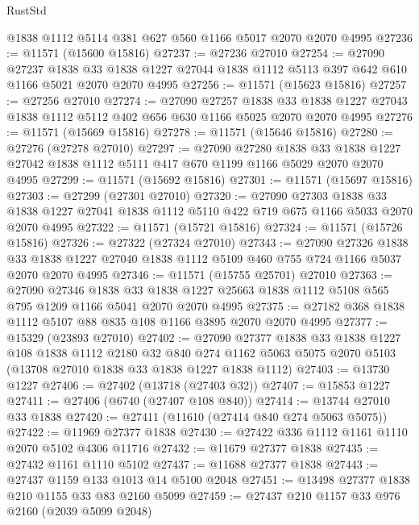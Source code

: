 \begin{lexlean}{RustStd}
\begin{coremodule}
    @1838
    @1112
    @5114
    @381
    @627
    @560
    @1166
    @5017
    @2070
    @2070
    @4995
@27236 := @11571 (@15600 @15816)
@27237 := @27236 @27010
@27254 := @27090
    @27237
    @1838
    @33
    @1838
    @1227
    @27044
    @1838
    @1112
    @5113
    @397
    @642
    @610
    @1166
    @5021
    @2070
    @2070
    @4995
@27256 := @11571 (@15623 @15816)
@27257 := @27256 @27010
@27274 := @27090
    @27257
    @1838
    @33
    @1838
    @1227
    @27043
    @1838
    @1112
    @5112
    @402
    @656
    @630
    @1166
    @5025
    @2070
    @2070
    @4995
@27276 := @11571 (@15669 @15816)
@27278 := @11571 (@15646 @15816)
@27280 := @27276 (@27278 @27010)
@27297 := @27090
    @27280
    @1838
    @33
    @1838
    @1227
    @27042
    @1838
    @1112
    @5111
    @417
    @670
    @1199
    @1166
    @5029
    @2070
    @2070
    @4995
@27299 := @11571 (@15692 @15816)
@27301 := @11571 (@15697 @15816)
@27303 := @27299 (@27301 @27010)
@27320 := @27090
    @27303
    @1838
    @33
    @1838
    @1227
    @27041
    @1838
    @1112
    @5110
    @422
    @719
    @675
    @1166
    @5033
    @2070
    @2070
    @4995
@27322 := @11571 (@15721 @15816)
@27324 := @11571 (@15726 @15816)
@27326 := @27322 (@27324 @27010)
@27343 := @27090
    @27326
    @1838
    @33
    @1838
    @1227
    @27040
    @1838
    @1112
    @5109
    @460
    @755
    @724
    @1166
    @5037
    @2070
    @2070
    @4995
@27346 := @11571 (@15755 @25701) @27010
@27363 := @27090
    @27346
    @1838
    @33
    @1838
    @1227
    @25663
    @1838
    @1112
    @5108
    @565
    @795
    @1209
    @1166
    @5041
    @2070
    @2070
    @4995
@27375 := @27182 @368 @1838 @1112 @5107 @88 @835 @108 @1166 @3895 @2070 @2070 @4995
@27377 := @15329 (@23893 @27010)
@27402 := @27090
    @27377
    @1838
    @33
    @1838
    @1227
    @108
    @1838
    @1112
    @2180
    @32
    @840
    @274
    @1162
    @5063
    @5075
    @2070
    @5103
    (@13708 @27010 @1838 @33 @1838 @1227 @1838 @1112)
@27403 := @13730 @1227
@27406 := @27402 (@13718 (@27403 @32))
@27407 := @15853 @1227
@27411 := @27406 (@6740 (@27407 @108 @840))
@27414 := @13744 @27010 @33 @1838
@27420 := @27411 (@11610 (@27414 @840 @274 @5063 @5075))
@27422 := @11969 @27377 @1838
@27430 := @27422 @336 @1112 @1161 @1110 @2070 @5102 @4306 @11716
@27432 := @11679 @27377 @1838
@27435 := @27432 @1161 @1110 @5102
@27437 := @11688 @27377 @1838
@27443 := @27437 @1159 @133 @1013 @14 @5100 @2048
@27451 := @13498 @27377 @1838 @210 @1155 @33 @83 @2160 @5099
@27459 := @27437 @210 @1157 @33 @976 @2160 (@2039 @5099 @2048)

\end{coremodule}
\end{lexlean}
